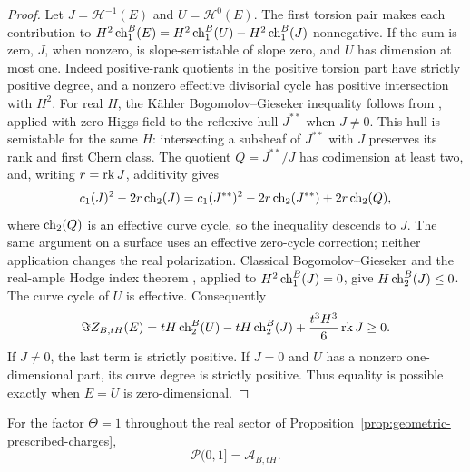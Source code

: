 \begin{proof}
Let $J=\mathcal H^{-1}(E)$ and $U=\mathcal H^0(E)$.
The first torsion pair makes each contribution to
$H^2\operatorname{ch}_1^B(E)=H^2\operatorname{ch}_1^B(U)-H^2\operatorname{ch}_1^B(J)$ nonnegative.
If the sum is zero, $J$, when nonzero, is slope-semistable of slope zero,
and $U$ has dimension at most one.  Indeed positive-rank quotients in the
positive torsion part have strictly positive degree, and a nonzero
effective divisorial cycle has positive intersection with $H^2$.
For real $H$, the K\"ahler Bogomolov--Gieseker inequality follows from
\cite[Theorem~1.1, Equation~(1.6)]{LiZhangZhang2017}, applied with zero
Higgs field to the reflexive hull $J^{**}$ when $J\ne0$.
This hull is semistable for the same $H$: intersecting a subsheaf of
$J^{**}$ with $J$ preserves its rank and first Chern class.
The quotient $Q=J^{**}/J$ has codimension at least two, and, writing
$r=\operatorname{rk} J$, additivity gives
\[
 c_1(J)^2-2r\operatorname{ch}_2(J)
 =c_1(J^{**})^2-2r\operatorname{ch}_2(J^{**})+2r\operatorname{ch}_2(Q),
\]
where $\operatorname{ch}_2(Q)$ is an effective curve cycle, so the inequality descends
to $J$.
The same argument on a surface uses an effective zero-cycle correction;
neither application changes the real polarization.
Classical Bogomolov--Gieseker and the real-ample Hodge index theorem
\cite[Theorem~6.4]{GrebRossToma2016}, applied to
$H^2\operatorname{ch}_1^B(J)=0$, give
$H\operatorname{ch}_2^B(J)\le0$.  The curve cycle of $U$ is effective.  Consequently
\[
 \Im Z_{B,tH}(E)=
 tH\operatorname{ch}_2^B(U)-tH\operatorname{ch}_2^B(J)+\frac{t^3H^3}{6}\operatorname{rk} J\ge0.
\]
If $J\ne0$, the last term is strictly positive.  If $J=0$ and $U$ has a
nonzero one-dimensional part, its curve degree is strictly positive.
Thus equality is possible exactly when $E=U$ is zero-dimensional.
\end{proof}

\begin{proposition}\label{prop:exact-double-tilt-heart}
For the factor $\Theta=1$ throughout the real sector of
Proposition~\ref{prop:geometric-prescribed-charges},
\[
 \mathcal P(0,1]=\mathcal A_{B,tH}.
\]
\end{proposition}

